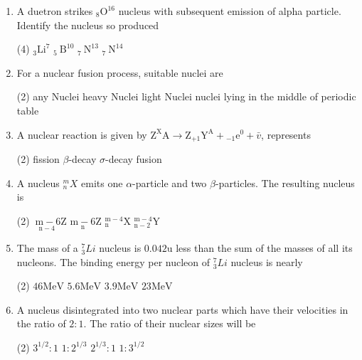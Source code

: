 \begin{enumerate}
\begin{tasks}
		\task[\textbf{D.}]The nuclear force is charge dependent
	\end{tasks}
	\item A duetron strikes ${ }_{8} \mathrm{O}^{16}$ nucleus with subsequent emission of alpha particle. Identify the nucleus so produced
	\begin{tasks}(4)
		\task[\textbf{A.}] ${ }_{3} \mathrm{Li}^{7}$
		\task[\textbf{B.}]  ${ }_{5} \mathrm{~B}^{10}$
		\task[\textbf{C.}]${ }_{7} \mathrm{~N}^{13}$
		\task[\textbf{D.}]${ }_{7} \mathrm{~N}^{14}$
	\end{tasks}
	\item For a nuclear fusion process, suitable nuclei are
	\begin{tasks}(2)
		\task[\textbf{A.}]any Nuclei 
		\task[\textbf{B.}] heavy Nuclei
		\task[\textbf{C.}]light Nuclei
		\task[\textbf{D.}]nuclei lying in the middle of periodic table
	\end{tasks}
	\item A nuclear reaction is given by $\mathrm{Z}^{\mathrm{X}}{\mathrm{A}} \rightarrow \mathrm{Z}_{+1} \mathrm{Y}^{\mathrm{A}}+{ }_{-1} \mathrm{e}^{0}+\bar{v}$, represents
	\begin{tasks}(2)
		\task[\textbf{A.}] fission
		\task[\textbf{B.}] $\beta$-decay
		\task[\textbf{C.}]$\sigma$-decay
		\task[\textbf{D.}]fusion
	\end{tasks}
	\item A nucleus ${ }_{n}^{m} X$ emits one $\alpha$-particle and two $\beta$-particles. The resulting nucleus is
	\begin{tasks}(2)
		\task[\textbf{A.}] $\underset{\mathrm{n}-4}{\mathrm{~m}-6} \mathrm{Z}$
		\task[\textbf{B.}] $\underset{\mathrm{n}}{\mathrm{m}-6} \mathrm{Z}$
		\task[\textbf{C.}]${ }_{\mathrm{n}}^{\mathrm{m}-4} \mathrm{X}$
		\task[\textbf{D.}]${ }_{\mathrm{n}-2}^{\mathrm{m}-4} \mathrm{Y}$
	\end{tasks}
	\item The mass of a ${ }_{3}^{7} L i$ nucleus is $0.042 \mathrm{u}$ less than the sum of the masses of all its nucleons. The binding energy per nucleon of ${ }_{3}^{7} L i$ nucleus is nearly
	\begin{tasks}(2)
		\task[\textbf{A.}]$46 \mathrm{MeV}$
		\task[\textbf{B.}] $5.6 \mathrm{MeV}$
		\task[\textbf{C.}]$3.9 \mathrm{MeV}$
		\task[\textbf{D.}]$23 \mathrm{MeV}$ 
	\end{tasks}		
	\item A nucleus disintegrated into two nuclear parts which have their velocities in the ratio of $2: 1$. The ratio of their nuclear sizes will be
	\begin{tasks}(2)
		\task[\textbf{A.}]  $3^{1 / 2}: 1$
		\task[\textbf{B.}]  $1: 2^{1 / 3}$
		\task[\textbf{C.}]$2^{1 / 3}: 1$
		\task[\textbf{D.}]$1: 3^{1 / 2}$
	\end{tasks}	
\end{enumerate}